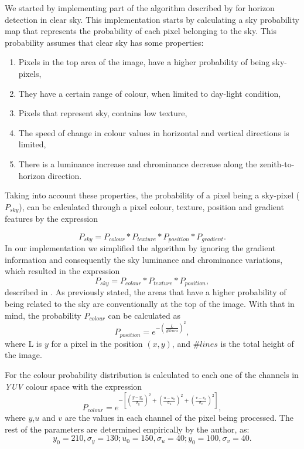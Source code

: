 We started by implementing part of the algorithm described by \citeauthor{zafarifar2008horizon} \cite{zafarifar2008horizon} for horizon detection in clear sky. This implementation starts by calculating a sky probability map that represents the probability of each pixel belonging to the sky. This probability assumes that clear sky has some properties:
\begin{enumerate}
	\item Pixels in the top area of the image, have a higher probability of being sky-pixels,
	\item They have a certain range of colour, when limited to day-light condition,
	\item Pixels that represent sky, contains low texture,
	\item The speed of change in colour values in horizontal and vertical directions is limited,
	\item There is a luminance increase and chrominance decrease along the zenith-to-horizon direction.
\end{enumerate}
Taking into account these properties, the probability of a pixel being a sky-pixel ($P_{sky}$), can be calculated through a pixel colour, texture, position and gradient features by the expression

\begin{equation}
	P_{sky} = P_{colour} * P_{texture} * P_{position} * P_{gradient}.
	\label{eq:cd_eq}
\end{equation}
In our implementation we simplified the algorithm by ignoring the gradient information and consequently the sky luminance and chrominance variations, which resulted in the expression
\begin{equation}
	P_{sky} = P_{colour} * P_{texture} * P_{position},
\end{equation}
described in \cite{herman2003adaptive}. As previously stated, the areas that have a higher probability of being related to the sky are conventionally at the top of the image. With that in mind, the probability $P_{colour}$ can be calculated as
\begin{equation}
	P_{position} = e^{- \left( \frac{L}{\#lines} \right)^2},
	\label{eq:colour_sky}
\end{equation}
where L is $y$ for a pixel in the position $(x,y)$, and $\#lines$ is the total height of the image.

For the colour probability distribution is calculated to each one of the channels in \emph{YUV} colour space with the expression
\begin{equation}
	P_{colour} =  e^{- \left[ \left(\frac{y-y_{0}}{\sigma_{y}} \right)^2 + \left(\frac{u-u_{0}}{\sigma_{u}} \right)^2 + \left(\frac{v-v_{0}}{\sigma_{v}} \right)^2\right]},
\end{equation}
where $y$,$u$ and $v$ are the values in each channel of the pixel being processed. The rest of the parameters are determined empirically by the author, as:
\begin{equation}
	y_{0} = 210, \sigma_{y}=130;
	u_{0} = 150, \sigma_{u}=40;
	y_{0} = 100, \sigma_{v}=40.
\end{equation}


